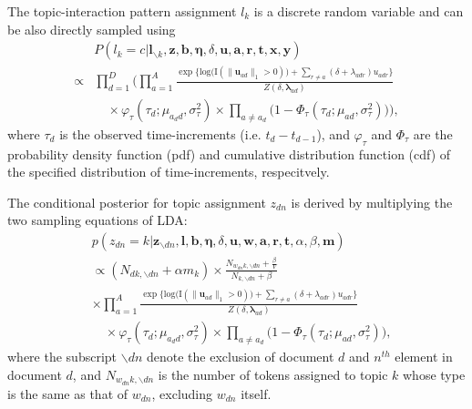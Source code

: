 \documentclass{article}
\begin{document}
The topic-interaction pattern assignment $l_k$ is a discrete random variable and can be also directly sampled using
       \begin{equation}
       \begin{aligned} & 
       P(l_k=c|\boldsymbol{l}_{\backslash k}, \boldsymbol{z}, \boldsymbol{b},\boldsymbol{\eta}, \delta, \boldsymbol{u}, \boldsymbol{a}, \boldsymbol{r}, \boldsymbol{t}, \boldsymbol{x},  \boldsymbol{y})\\
     \propto   &\prod_{d=1}^D\Big(
       \prod_{a=1}^A \frac{\exp\Big\{\mbox{log}\big(\text{I}( \lVert \boldsymbol{u}_{ad}\rVert_1 > 0)\big) + \sum\limits_{r \neq a} (\delta+\lambda_{adr})u_{adr}\Big\}}{Z(\delta,\boldsymbol{\lambda}_{ad})}
       \\&\quad\times\varphi_{\tau}(\tau_{d}; \mu_{a_d d}, \sigma_\tau^2)\times \prod_{a\neq a_d}\big(1-\Phi_{\tau}(\tau_{d}; \mu_{a d}, \sigma_\tau^2) \big)\Big),
       \end{aligned}
       \end{equation}
where $\tau_d$ is the observed time-increments (i.e. $t_d - t_{d-1}$), and $\varphi_\tau$ and $\Phi_\tau$ are the probability density function (pdf) and cumulative distribution function (cdf) of the specified distribution of time-increments, respecitvely. 

The conditional posterior for topic assignment $z_{dn}$ is derived by multiplying the two sampling equations of LDA:
  	   \begin{equation}
  	   \begin{aligned}
  	   &p(z_{dn}=k| \boldsymbol{z}_{\backslash dn}, \boldsymbol{l}, \boldsymbol{b},\boldsymbol{\eta}, \delta, \boldsymbol{u}, \boldsymbol{w}, \boldsymbol{a}, \boldsymbol{r}, \boldsymbol{t}, \alpha, \beta, \boldsymbol{m})\\&\propto
  	   ({N_{dk, \backslash dn}+\alpha m_k})\times 	  \frac{N_{w_{dn}k, \backslash dn}+\frac{\beta}{V}}{N_{k, \backslash dn}+\beta}
  	   \\&  \times \prod_{a=1}^A \frac{\exp\Big\{\mbox{log}\big(\text{I}( \lVert \boldsymbol{u}_{ad}\rVert_1 > 0)\big) + \sum\limits_{r\neq a} (\delta+\lambda_{adr})u_{adr}\Big\}}{Z(\delta,\boldsymbol{\lambda}_{ad})}
  	   \\&\quad\times\varphi_{\tau}(\tau_{d}; \mu_{a_d d}, \sigma_\tau^2)\times \prod_{a\neq a_d}\big(1-\Phi_{\tau}(\tau_{d}; \mu_{a d}, \sigma_\tau^2) \big),
  	   \end{aligned}
  	   \end{equation}
  	   where the subscript $\backslash dn$ denote the exclusion of document $d$ and $n^{th}$ element in document $d$, and $N_{w_{dn}k, \backslash dn}$ is the number of tokens assigned to topic $k$ whose type is the same as that of $w_{dn}$, excluding $w_{dn}$ itself. 
  	   
\end{document}
